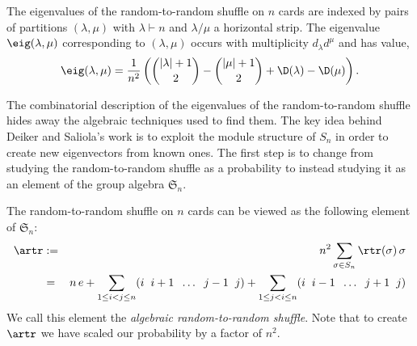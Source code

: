 \documentclass[11pt]{report}
\begin{document}
\begin{thm}
	\label{chpt4:thm:rtreigenvalues}
	The eigenvalues of the random-to-random shuffle on $n$ cards are indexed by pairs of partitions
	$(\lambda, \mu)$ with $\lambda \vdash n$ and  $\lambda/\mu$ a horizontal strip. The 
	eigenvalue $\eig(\lambda,\mu)$ corresponding to $(\lambda,\mu)$ occurs with multiplicity $d_{\lambda}d^{\mu}$ and has value,
	\[\eig(\lambda,\mu) = \frac{1}{n^{2}}\left( {|\lambda|+1 \choose 2} - 
	{|\mu|+1\choose 2} + \D(\lambda) - \D(\mu) \right).\]
\end{thm}
The combinatorial description of the eigenvalues of the random-to-random shuffle hides away the algebraic techniques used to find them. 
The key idea behind Deiker and Saliola's work is to exploit the module structure of $S_{n}$ in order to create new eigenvectors from known ones. 
The first step is to change from studying the random-to-random shuffle as a probability to instead studying it as an element of the group algebra $\mathfrak{S}_{n}$.



















\begin{defn}
	The random-to-random shuffle on $n$ cards can be viewed as the following element of $\mathfrak{S}_{n}$:
	\begin{eqnarray}
	\artr & := &n^{2} \sum_{\sigma \in S_{n}} \rtr(\sigma) \, \sigma 
	\nonumber\\
	& = &n \, 
	e + \sum_{1 \leq i <j \leq n} (i \hspace{0.2cm} i+1 \hspace{0.2cm} 
	\dots 
	\hspace{0.2cm} j-1 \hspace{0.2cm} j) + \sum_{1 
		\leq j <i \leq n} (i \hspace{0.2cm} i-1 \hspace{0.2cm} \dots 
	\hspace{0.2cm} j+1 \hspace{0.2cm} j)
	\end{eqnarray}
	We call this element the \emph{algebraic random-to-random shuffle}.
	Note that to create $\artr$ we have scaled our probability by a factor of $n^{2}$.
\end{defn}
\end{document}
